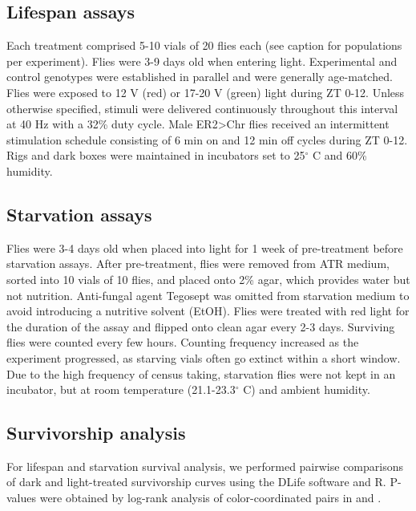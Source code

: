 \subsection*{Lifespan assays}

Each treatment comprised 5-10 vials of 20 flies each (see  caption for populations per experiment). 
Flies were 3-9 days old when entering light.
Experimental and control genotypes were established in parallel and were generally age-matched.
Flies were exposed to 12 V (red) or 17-20 V (green) light during ZT 0-12.
Unless otherwise specified, stimuli were delivered continuously throughout this interval at 40 Hz with a 32\% duty cycle.
Male ER2>Chr flies received an intermittent stimulation schedule consisting of 6 min on and 12 min off cycles during ZT 0-12.
Rigs and dark boxes were maintained in incubators set to 25$^{\circ}$ C and 60\% humidity. 

\subsection*{Starvation assays}

Flies were 3-4 days old when placed into light for 1 week of pre-treatment before starvation assays. 
After pre-treatment, flies were removed from ATR medium, sorted into 10 vials of 10 flies, and placed onto 2\% agar, which provides water but not nutrition.
Anti-fungal agent Tegosept was omitted from starvation medium to avoid introducing a nutritive solvent (EtOH). 
Flies were treated with red light for the duration of the assay and flipped onto clean agar every 2-3 days.
Surviving flies were counted every few hours. 
Counting frequency increased as the experiment progressed, as starving vials often go extinct within a short window. 
Due to the high frequency of census taking, starvation flies were not kept in an incubator, but at room temperature (21.1-23.3$^{\circ}$ C) and ambient humidity.

\subsection*{Survivorship analysis}

For lifespan and starvation survival analysis, we performed pairwise comparisons of dark and light-treated survivorship curves using the DLife software \citep{linford2013} and R. 
P-values were obtained by log-rank analysis of color-coordinated pairs in  and .

